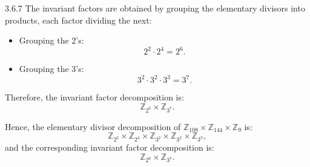 \documentclass[12pt]{amsart}
\theoremstyle{definition}
\numberwithin{equation}{section}
\newcommand{\Z}{\mathbb{Z}}
\begin{document}
\begin{exercise}{3.6.7}
    The invariant factors are obtained by grouping the elementary divisors into products, each factor dividing the next:

    \begin{itemize}
        \item Grouping the 2's:
            \[
            2^2 \cdot 2^4 = 2^6.
            \]
        \item Grouping the 3's:
            \[
            3^2 \cdot 3^2 \cdot 3^3 = 3^7.
            \]
    \end{itemize}

    Therefore, the invariant factor decomposition is:
    \[
    \Z_{2^6} \times \Z_{3^7}.
    \]

    Hence, the elementary divisor decomposition of \(\Z_{108} \times \Z_{144} \times \Z_9\) is:
    \[
    \Z_{2^2} \times \Z_{2^4} \times \Z_{3^2} \times \Z_{3^2} \times \Z_{3^3},
    \]
    and the corresponding invariant factor decomposition is:
    \[
    \Z_{2^6} \times \Z_{3^7}.
    \]

\end{exercise}
\newpage
\end{document}
